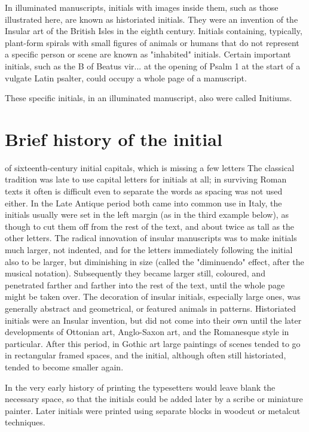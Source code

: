 In illuminated manuscripts, initials with images inside them, such as those illustrated here, are known as historiated initials. They were an invention of the Insular art of the British Isles in the eighth century. Initials containing, typically, plant-form spirals with small figures of animals or humans that do not represent a specific person or scene are known as "inhabited" initials. Certain important initials, such as the B of Beatus vir... at the opening of Psalm 1 at the start of a vulgate Latin psalter, could occupy a whole page of a manuscript.

These specific initials, in an illuminated manuscript, also were called Initiums.

\section{Brief history of the initial}

 of sixteenth-century initial capitals, which is missing a few letters
The classical tradition was late to use capital letters for initials at all; in surviving Roman texts it often is difficult even to separate the words as spacing was not used either. In the Late Antique period both came into common use in Italy, the initials usually were set in the left margin (as in the third example below), as though to cut them off from the rest of the text, and about twice as tall as the other letters. The radical innovation of insular manuscripts was to make initials much larger, not indented, and for the letters immediately following the initial also to be larger, but diminishing in size (called the "diminuendo" effect, after the musical notation). Subsequently they became larger still, coloured, and penetrated farther and farther into the rest of the text, until the whole page might be taken over. The decoration of insular initials, especially large ones, was generally abstract and geometrical, or featured animals in patterns. Historiated initials were an Insular invention, but did not come into their own until the later developments of Ottonian art, Anglo-Saxon art, and the Romanesque style in particular. After this period, in Gothic art large paintings of scenes tended to go in rectangular framed spaces, and the initial, although often still historiated, tended to become smaller again.

In the very early history of printing the typesetters would leave blank the necessary space, so that the initials could be added later by a scribe or miniature painter. Later initials were printed using separate blocks in woodcut or metalcut techniques.


